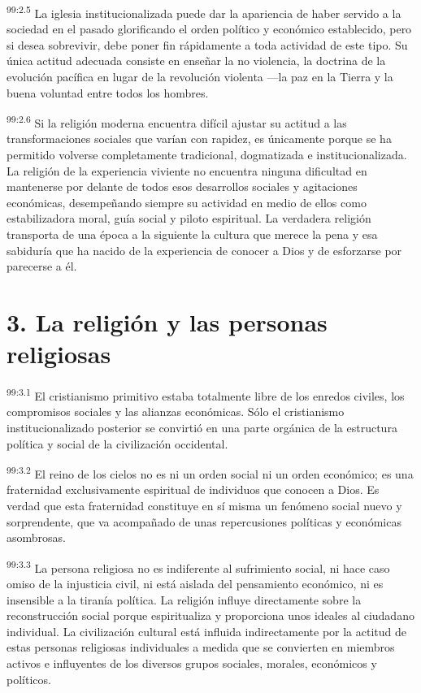 \documentclass[twoside, 11pt]{book}
\begin{document}
\par
\textsuperscript{99:2.5} La iglesia institucionalizada puede dar la apariencia de haber servido a la sociedad en el pasado glorificando el orden político y económico establecido, pero si desea sobrevivir, debe poner fin rápidamente a toda actividad de este tipo. Su única actitud adecuada consiste en enseñar la no violencia, la doctrina de la evolución pacífica en lugar de la revolución violenta ---la paz en la Tierra y la buena voluntad entre todos los hombres.

\par
\textsuperscript{99:2.6} Si la religión moderna encuentra difícil ajustar su actitud a las transformaciones sociales que varían con rapidez, es únicamente porque se ha permitido volverse completamente tradicional, dogmatizada e institucionalizada. La religión de la experiencia viviente no encuentra ninguna dificultad en mantenerse por delante de todos esos desarrollos sociales y agitaciones económicas, desempeñando siempre su actividad en medio de ellos como estabilizadora moral, guía social y piloto espiritual. La verdadera religión transporta de una época a la siguiente la cultura que merece la pena y esa sabiduría que ha nacido de la experiencia de conocer a Dios y de esforzarse por parecerse a él.

\section*{3. La religión y las personas religiosas}
\par
\textsuperscript{99:3.1} El cristianismo primitivo estaba totalmente libre de los enredos civiles, los compromisos sociales y las alianzas económicas. Sólo el cristianismo institucionalizado posterior se convirtió en una parte orgánica de la estructura política y social de la civilización occidental.

\par
\textsuperscript{99:3.2} El reino de los cielos no es ni un orden social ni un orden económico; es una fraternidad exclusivamente espiritual de individuos que conocen a Dios. Es verdad que esta fraternidad constituye en sí misma un fenómeno social nuevo y sorprendente, que va acompañado de unas repercusiones políticas y económicas asombrosas.

\par
\textsuperscript{99:3.3} La persona religiosa no es indiferente al sufrimiento social, ni hace caso omiso de la injusticia civil, ni está aislada del pensamiento económico, ni es insensible a la tiranía política. La religión influye directamente sobre la reconstrucción social porque espiritualiza y proporciona unos ideales al ciudadano individual. La civilización cultural está influida indirectamente por la actitud de estas personas religiosas individuales a medida que se convierten en miembros activos e influyentes de los diversos grupos sociales, morales, económicos y políticos.
\end{document}

